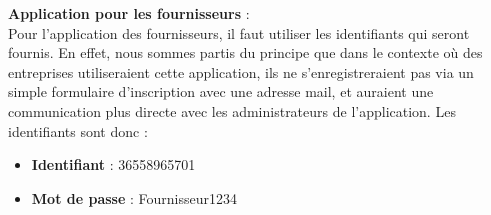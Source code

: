 \documentclass[../rapport.tex]{subfiles}
\begin{document}
\textbf{Application pour les fournisseurs} : \\ 
Pour l'application des fournisseurs, il faut utiliser les identifiants qui seront fournis. En effet, nous sommes partis du principe que dans le contexte où des entreprises utiliseraient cette application, ils ne s'enregistreraient pas via un simple formulaire d'inscription avec une adresse mail, et auraient une communication plus directe avec les administrateurs de l'application. Les identifiants sont donc : 
\begin{itemize}
  \item \textbf{Identifiant} : 36558965701
  \item \textbf{Mot de passe} : Fournisseur1234
\end{itemize}
\end{document}
